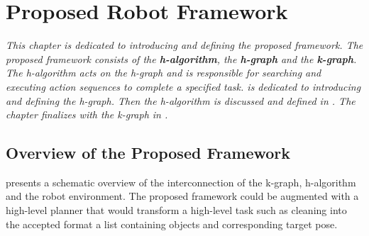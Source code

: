 
 
\chapter{Proposed Robot Framework}%
\label{chap:h-graph_and_k-graph}
\textit{This chapter is dedicated to introducing and defining the proposed framework. The proposed framework consists of the \textbf{\acf{h-algorithm}}, the \textbf{\acf{h-graph}} and the \textbf{\acf{k-graph}}. The \ac{h-algorithm} acts on the \ac{h-graph} and is responsible for searching and executing action sequences to complete a specified task.  is dedicated to introducing and defining the \ac{h-graph}. Then the \ac{h-algorithm} is discussed and defined in . The chapter finalizes with the \ac{k-graph} in .\bs}

\section{Overview of the Proposed Framework}
 presents a schematic overview of the interconnection of the \ac{k-graph}, \ac{h-algorithm} and the robot environment. The proposed framework could be augmented with a high-level planner that would transform a high-level task such as cleaning into the accepted format a list containing objects and corresponding target pose.\bs

